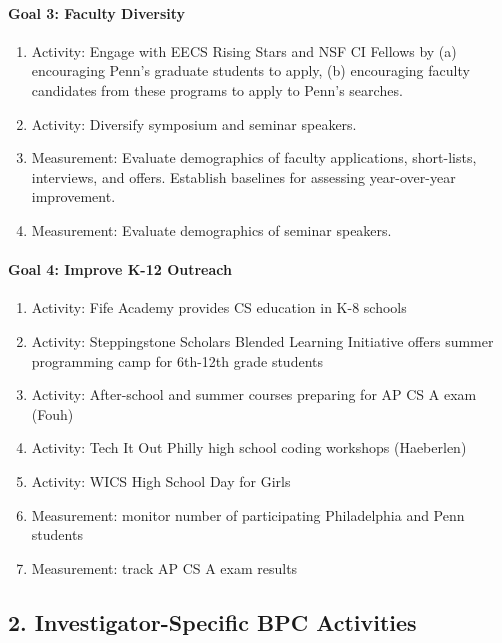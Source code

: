 \paragraph*{Goal 3: Faculty Diversity}

\begin{enumerate}
\item Activity: Engage with EECS Rising Stars and NSF CI Fellows by (a) encouraging Penn’s graduate students to apply, (b) encouraging faculty candidates from these programs to apply to Penn's searches.
\item Activity: Diversify symposium and seminar speakers.
\item Measurement: Evaluate demographics of faculty applications, short-lists, interviews, and offers. Establish baselines for assessing year-over-year improvement.
\item Measurement: Evaluate demographics of seminar speakers.
\end{enumerate}

\paragraph*{Goal 4: Improve K-12 Outreach}

\begin{enumerate}
\item Activity: Fife Academy provides CS education in K-8 schools
\item Activity: Steppingstone Scholars Blended Learning Initiative offers summer programming camp for 6th-12th grade students
\item Activity: After-school and summer courses preparing for AP CS A exam (Fouh)
\item Activity: Tech It Out Philly high school coding workshops (Haeberlen)
\item Activity: WICS High School Day for Girls
\item Measurement: monitor number of participating Philadelphia and Penn students
\item Measurement: track AP CS A exam results
\end{enumerate}

\subsection*{2. Investigator-Specific BPC Activities}


